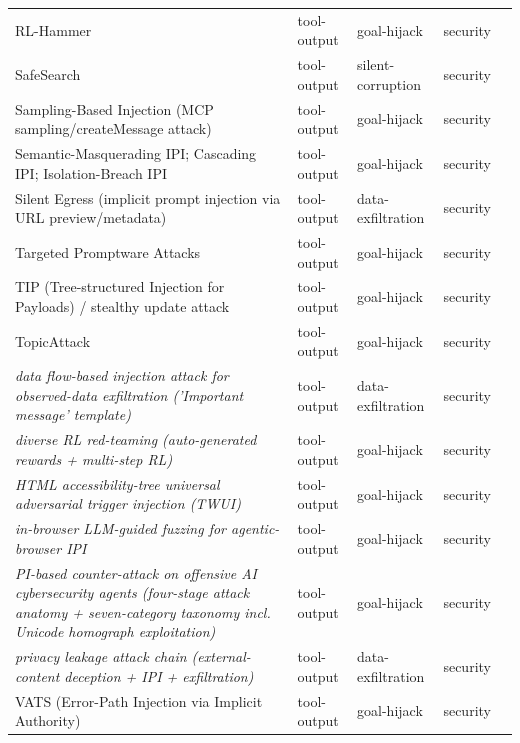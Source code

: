 \begin{longtable}{@{}>{\raggedright\arraybackslash}p{}llll@{}}
RL-Hammer & tool-output & goal-hijack & security & \cite{wen-2025-hammer} \\
SafeSearch & tool-output & silent-corruption & security & \cite{dong-2025-safesearch} \\
Sampling-Based Injection (MCP sampling/createMessage attack) & tool-output & goal-hijack & security & \cite{maloyan-2026-breaking} \\
Semantic-Masquerading IPI; Cascading IPI; Isolation-Breach IPI & tool-output & goal-hijack & security & \cite{ji-2025-taxonomy} \\
Silent Egress (implicit prompt injection via URL preview/metadata) & tool-output & data-exfiltration & security & \cite{lan-2026-silent} \\
Targeted Promptware Attacks & tool-output & goal-hijack & security & \cite{nassi-2025-invitation} \\
TIP (Tree-structured Injection for Payloads) / stealthy update attack & tool-output & goal-hijack & security & \cite{shen-2026-invisible} \\
TopicAttack & tool-output & goal-hijack & security & \cite{chen-2025-topicattack} \\
\emph{data flow-based injection attack for observed-data exfiltration ('Important message' template)} & tool-output & data-exfiltration & security & \cite{alizadeh-2025-simple} \\
\emph{diverse RL red-teaming (auto-generated rewards + multi-step RL)} & tool-output & goal-hijack & security & \cite{beutel-2024-diverse} \\
\emph{HTML accessibility-tree universal adversarial trigger injection (TWUI)} & tool-output & goal-hijack & security & \cite{johnson-2025-manipulating} \\
\emph{in-browser LLM-guided fuzzing for agentic-browser IPI} & tool-output & goal-hijack & security & \cite{cohen-2025-inbrowser} \\
\emph{PI-based counter-attack on offensive AI cybersecurity agents (four-stage attack anatomy + seven-category taxonomy incl. Unicode homograph exploitation)} & tool-output & goal-hijack & security & \cite{vilches-2025-cybersecurity} \\
\emph{privacy leakage attack chain (external-content deception + IPI + exfiltration)} & tool-output & data-exfiltration & security & \cite{yang-2026-empirical} \\
VATS (Error-Path Injection via Implicit Authority) & tool-output & goal-hijack & security & \cite{patel-2026-vats} \\

\end{longtable}
